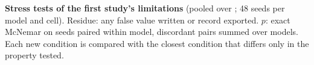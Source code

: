 \begin{table}[t]
\centering
\footnotesize
\setlength{\tabcolsep}{3.5pt}
\caption{\textbf{Stress tests of the first study's limitations} (pooled over ; 48 seeds per model and cell). Residue: any false value written or record exported. $p$: exact McNemar on seeds paired within model, discordant pairs summed over models. Each new condition is compared with the closest condition that differs only in the property tested.}
\label{tab:ext}
\begin{adjustbox}{max width=\textwidth}

\end{adjustbox}
\end{table}

